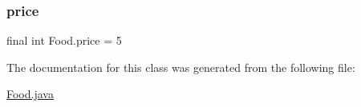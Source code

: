 \subsubsection{\texorpdfstring{price}{price}}
{\footnotesize\ttfamily final int Food.\+price = 5\hspace{0.3cm}{\ttfamily [static]}}



The documentation for this class was generated from the following file\+:\begin{DoxyCompactItemize}
\item 
\mbox{\hyperlink{_food_8java}{Food.\+java}}\end{DoxyCompactItemize}

